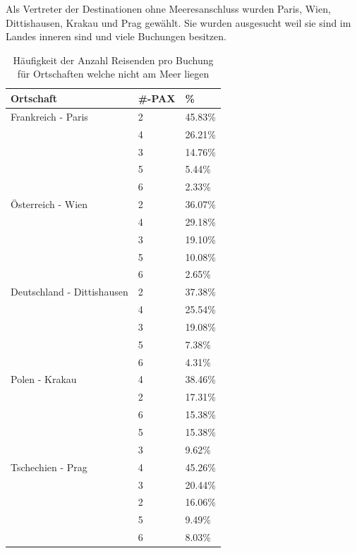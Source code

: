 Als Vertreter der Destinationen ohne Meeresanschluss wurden Paris, Wien, Dittishausen, Krakau und Prag gewählt. Sie wurden ausgesucht weil sie sind im Landes inneren sind und viele Buchungen besitzen. 
\begin{table}[H] 
	\caption{Häufigkeit der Anzahl Reisenden pro Buchung für Ortschaften welche nicht am Meer liegen}
	\centering
	\label{sec:testingfazit:testing:hypothesen:3}
	\begin{tabular}{ | l | l | l | } 
		\hline 
		\rowcolor{tableheadcolor}
		\bfseries Ortschaft & \bfseries \#-PAX & \bfseries \% \\ \hline 
		Frankreich - Paris & 2 & \cellcolor{red!25}45.83\% \\ \cline{2-3} 
		 & 4 & \cellcolor{green!25}26.21\% \\ \cline{2-3}
		 & 3 & 14.76\% \\ \cline{2-3} 
		 & 5 & 5.44\% \\ \cline{2-3}
		 & 6 & 2.33\% \\ \hline 
		Österreich - Wien & 2 & \cellcolor{red!25}36.07\% \\ \cline{2-3} 
		 & 4 & \cellcolor{green!25}29.18\% \\ \cline{2-3}
		 & 3 & 19.10\% \\ \cline{2-3} 
		 & 5 & 10.08\% \\ \cline{2-3}
		 & 6 & 2.65\% \\ \hline 
		Deutschland - Dittishausen & 2 & \cellcolor{red!25}37.38\% \\ \cline{2-3}
		& 4 & \cellcolor{green!25}25.54\% \\ \cline{2-3} 
		& 3 & 19.08\% \\ \cline{2-3}
		& 5 & 7.38\% \\ \cline{2-3}
		& 6 & 4.31\% \\ \hline 
		Polen - Krakau & 4 & \cellcolor{green!25}38.46\% \\ \cline{2-3}
		& 2 & \cellcolor{red!25}17.31\% \\ \cline{2-3} 
		& 6 & 15.38\% \\ \cline{2-3}
		& 5 & 15.38\% \\ \cline{2-3}
		& 3 & 9.62\% \\ \hline 
		Tschechien - Prag & 4 & \cellcolor{green!25}45.26\% \\ \cline{2-3} 
		& 3 & 20.44\% \\ \cline{2-3}
		& 2 & \cellcolor{red!25}16.06\% \\ \cline{2-3} 
		& 5 & 9.49\% \\ \cline{2-3}
		& 6 & 8.03\% \\ \hline 
	\end{tabular}
\end{table}

